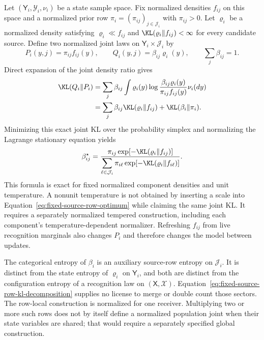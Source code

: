 Let \((\mathsf Y_i,\mathscr Y_i,\nu_i)\) be a state sample space. Fix normalized densities \(f_{ij}\) on this space and a normalized prior row \(\pi_i=(\pi_{ij})_{j\in\mathcal J_i}\) with \(\pi_{ij}>0\). Let \(\varrho_i\) be a normalized density satisfying \(\varrho_i\ll f_{ij}\) and \(\KL(\varrho_i\Vert f_{ij})<\infty\) for every candidate source. Define two normalized joint laws on \(\mathsf Y_i\times\mathcal J_i\) by
\begin{equation}
P_i(y,j)=\pi_{ij}f_{ij}(y),
\qquad
Q_i(y,j)=\beta_{ij}\varrho_i(y),
\qquad
\sum_j\beta_{ij}=1.
\label{eq:fixed-source-row-joints}
\end{equation}
Direct expansion of the joint density ratio gives
\begin{align}
\KL(Q_i\Vert P_i)
&=\sum_j\beta_{ij}
\int \varrho_i(y)
\log\frac{\beta_{ij}\varrho_i(y)}{\pi_{ij}f_{ij}(y)}\nu_i(dy)
\label{eq:fixed-source-row-kl-expansion}\\
&=\sum_j\beta_{ij}\KL(\varrho_i\Vert f_{ij})
+\KL(\beta_i\Vert\pi_i).
\label{eq:fixed-source-row-kl-decomposition}
\end{align}
Minimizing this exact joint KL over the probability simplex and normalizing the Lagrange stationary equation yields
\begin{equation}
\beta_{ij}^\star
=\frac{\pi_{ij}\exp[-\KL(\varrho_i\Vert f_{ij})]}
{\displaystyle\sum_{\ell\in\mathcal J_i}
\pi_{i\ell}\exp[-\KL(\varrho_i\Vert f_{i\ell})]}.
\label{eq:fixed-source-row-optimum}
\end{equation}
This formula is exact for fixed normalized component densities and unit temperature. A nonunit temperature is not obtained by inserting a scale into Equation~\eqref{eq:fixed-source-row-optimum} while claiming the same joint KL. It requires a separately normalized tempered construction, including each component's temperature-dependent normalizer. Refreshing \(f_{ij}\) from live recognition marginals also changes \(P_i\) and therefore changes the model between updates.

The categorical entropy of \(\beta_i\) is an auxiliary source-row entropy on \(\mathcal J_i\). It is distinct from the state entropy of \(\varrho_i\) on \(\mathsf Y_i\), and both are distinct from the configuration entropy of a recognition law on \((\mathsf X,\mathscr X)\). Equation~\eqref{eq:fixed-source-row-kl-decomposition} supplies no license to merge or double count those sectors.
The row-local construction is normalized for one receiver. Multiplying two or more such rows does not by itself define a normalized population joint when their state variables are shared; that would require a separately specified global construction.

